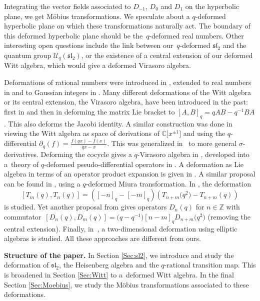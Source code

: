\documentclass[pdftex]{sigma}
\numberwithin{equation}{section}
\newcommand*{\C}{\mathbb{C}}
\newcommand*{\Z}{\mathbb{Z}}
\begin{document}
Integrating the vector fields associated to $D_{-1}$, $D_0$ and $D_1$ on the hyperbolic plane, we get M\"obius transformations. We speculate about a $q$-deformed hyperbolic plane on which these transformations naturally act. The boundary of this deformed hyperbolic plane should be the~$q$-deformed real numbers. Other interesting open questions include the link between our~$q$-deformed $\mathfrak{sl}_2$ and the quantum group $\mathcal{U}_q(\mathfrak{sl}_2)$, or the existence of a central extension of our deformed Witt algebra, which would give a deformed Virasoro algebra.

Deformations of rational numbers were introduced in \cite{morier2020continued}, extended to real numbers in \cite{morier2022q} and to Gaussian integers in \cite{ovsienko2021towards}. Many different deformations of the Witt algebra or its central extension, the Virasoro algebra, have been introduced in the past: first in \cite{curtright1990deforming} and then in \cite{chaichian1991q} deforming the matrix Lie bracket to $[A,B]_q=qAB-q^{-1}BA$. This also deforms the Jacobi identity. A similar construction was done in \cite{hu2005q} viewing the Witt algebra as space of derivations of $\C\big[x^{\pm 1}\big]$ and using the $q$-differential $\partial_q(f)=\tfrac{f(qx)-f(x)}{qx-x}$. This was generalized in~\cite{hartwig2006deformations} to more general $\sigma$-derivatives. Deforming the cocycle gives a $q$-Virasoro algebra in \cite{kassel1992cyclic}, developed into a~theory of $q$-deformed pseudo-differential operators in \cite{khesin1997extensions}. A deformation as Lie algebra in terms of an operator product expansion is given in \cite{shiraishi1996quantum}. A similar proposal can be found in \cite[equation (1.3)]{frenkel1996quantum}, using a $q$-deformed Miura transformation. In \cite[equation~(38)]{nedelin2017q}, the deformation
\[
[T_m(q),T_n(q)]=([-n]_q-[-m]_q)(T_{n+m}\big(q^2\big)-T_{n+m}(q))\]
 is studied. Yet another proposal from \cite[formula~(3.18)]{nigro2016q} gives operators $D_n(q)$ for $n\in\Z$ with commutator~${[D_n(q),D_m(q)]=\big(q-q^{-1}\big)[n-m]_qD_{n+m}\big(q^2\big)}$ (removing the central extension). Finally, in~\cite{avan2017deformed}, a two-dimensional deformation using elliptic algebras is studied. All these approaches are different from ours.

\textbf{Structure of the paper.} In Section \ref{Sec:sl2}, we introduce and study the deformation of $\mathfrak{sl}_2$, the Heisenberg algebra and the $q$-rational transition map. This is broadened in Section \ref{Sec:Witt} to a~deformed Witt algebra. In the final Section \ref{Sec:Moebius}, we study the M\"obius transformations associated to these deformations.
\end{document}
